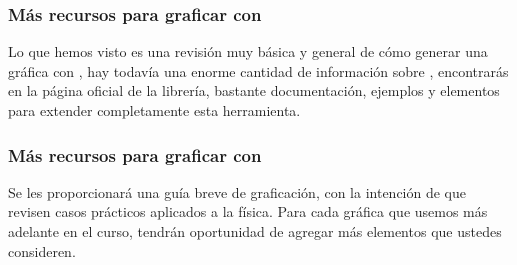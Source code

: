 \documentclass[12pt]{beamer}
\begin{document}
\begin{frame}
\frametitle{Más recursos para graficar con \python}
Lo que hemos visto es una revisión muy básica y general de cómo generar una gráfica con \python, hay todavía una enorme cantidad de información sobre , encontrarás en la página oficial de la librería, bastante documentación, ejemplos y elementos para extender completamente esta herramienta.
\end{frame}
\begin{frame}
\frametitle{Más recursos para graficar con \python}
Se les proporcionará una guía breve de graficación, con la intención de que revisen casos prácticos aplicados a la física. Para cada gráfica que usemos más adelante en el curso, tendrán oportunidad de agregar más elementos que ustedes consideren.
\end{frame}
\end{document}
